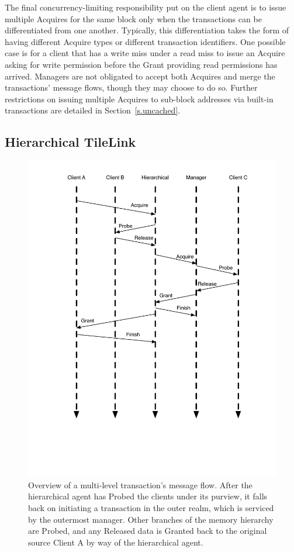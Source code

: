 The final concurrency-limiting responsibility put on the client agent is to issue multiple Acquires for the same block only when the transactions can be differentiated from one another.
Typically, this differentiation takes the form of having different Acquire types or different transaction identifiers.
One possible case is for a client that has a write miss under a read miss to issue an Acquire asking for write permission before the Grant providing read permissions has arrived.
Managers are not obligated to accept both Acquires and merge the transactions' message flows, though they may choose to do so.
Further restrictions on issuing multiple Acquires to sub-block addresses via built-in transactions are detailed in Section~\ref{s.uncached}.


\subsection{Hierarchical TileLink}
\label{s.tlhier}

\begin{figure}[p]
\centering
\includegraphics[width=0.8\columnwidth]{tilelink/figures/standard5.pdf}
\caption[A multi-level message flow.]{
Overview of a multi-level transaction's message flow.
After the hierarchical agent has Probed the clients under its purview, it falls back on initiating a transaction in the outer realm,
which is serviced by the outermost manager. Other branches of the memory hierarchy are Probed,
and any Released data is Granted back to the original source Client A by way of the hierarchical agent.
}
\label{fig:standard5}
\end{figure}

